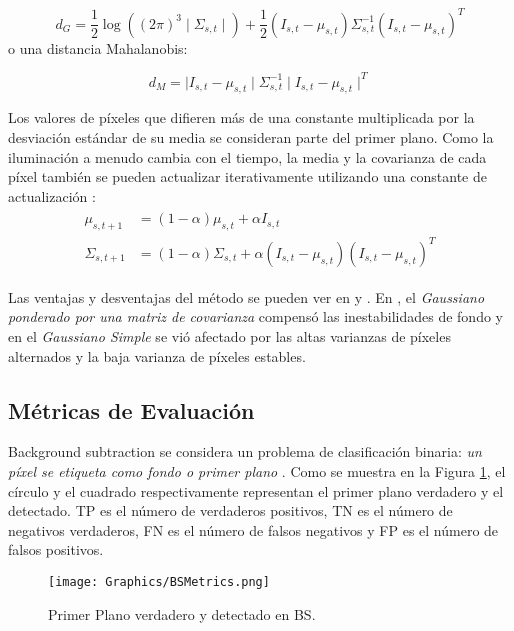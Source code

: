 $$d_G = \frac{1}{2}\log((2\pi)^3\mid\Sigma_{s,t}\mid)+\frac{1}{2}(I_{s,t}-\mu_{s,t})\Sigma_{s,t}^{-1}(I_{s,t}-\mu_{s,t})^T$$
o una distancia Mahalanobis:

$$d_M = \mid I_{s,t}-\mu_{s,t}\mid\Sigma_{s,t}^{-1}\mid I_{s,t}-\mu_{s,t}\mid^T$$

Los valores de píxeles que difieren más de una constante multiplicada por la desviación estándar de su media se consideran parte del primer plano. Como la iluminación a menudo cambia con el tiempo, la media y la covarianza de cada píxel también se pueden actualizar iterativamente utilizando una constante de actualización \cite{YannickPierreMarcBrunoHeleneChristophe}:
\begin{gather*}
    \begin{split}
        \mu_{s,t+1} & = (1-\alpha)\mu_{s,t}+\alpha I_{s,t}\\
        \Sigma_{s,t+1} & = (1-\alpha)\Sigma_{s,t}+\alpha(I_{s,t}-\mu_{s,t})(I_{s,t}-\mu_{s,t})^T
    \end{split}
\end{gather*}

Las ventajas y desventajas del método se pueden ver en \cite{BenezethJodoinEmileLaurentRosenberger} y \cite{GreffBrandoKrauStrickerClua}. En \cite{BenezethJodoinEmileLaurentRosenberger}, el \textit{Gaussiano ponderado por una matriz de covarianza} compensó las inestabilidades de fondo y en \cite{GreffBrandoKrauStrickerClua} el \textit{Gaussiano Simple} se vió afectado por las altas varianzas de píxeles alternados y la baja varianza de píxeles estables.

\subsection{Métricas de Evaluación}

Background subtraction se considera un problema de clasificación binaria: \textit {un píxel se etiqueta como fondo o primer plano} \cite{GuangleTaoJiandanPingWenwu}. Como se muestra en la Figura \ref{fig:BSMetrics}, el círculo y el cuadrado respectivamente representan el primer plano verdadero y el detectado. TP es el número de verdaderos positivos, TN es el número de negativos verdaderos, FN es el número de falsos negativos y FP es el número de falsos positivos.\\

\begin{figure}[!h]
    \centering
    \texttt{[image: Graphics/BSMetrics.png]}
    \caption{Primer Plano verdadero y detectado en BS.}
    \label{fig:BSMetrics}
\end{figure}

